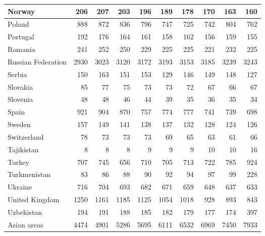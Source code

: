 \begin{table}
\begin{tabular}{|l|r|r|r|r|r|r|r|r|r|}
                        Norway&    206&    207&    203&    196&    189&    178&    170&    163&    160\\\hline
                        Poland&    888&    872&    836&    796&    747&    725&    742&    804&    762\\\hline
                      Portugal&    192&    176&    164&    161&    158&    162&    156&    159&    155\\\hline
                       Romania&    241&    252&    250&    229&    225&    225&    221&    232&    225\\\hline
            Russian Federation&   2930&   3023&   3120&   3172&   3193&   3153&   3185&   3239&   3243\\\hline
                        Serbia&    150&    163&    151&    153&    129&    146&    149&    148&    127\\\hline
                      Slovakia&     85&     77&     75&     73&     73&     72&     67&     66&     67\\\hline
                      Slovenia&     48&     48&     46&     44&     39&     35&     36&     35&     34\\\hline
                         Spain&    921&    904&    870&    757&    774&    777&    741&    739&    698\\\hline
                        Sweden&    157&    149&    141&    138&    137&    132&    128&    124&    126\\\hline
                   Switzerland&     78&     73&     73&     73&     69&     65&     63&     61&     66\\\hline
                    Tajikistan&      8&      8&      8&      9&      9&      9&     10&     10&     16\\\hline
                        Turkey&    707&    745&    656&    710&    705&    713&    722&    785&    924\\\hline
                  Turkmenistan&     83&     86&     88&     90&     92&     94&     97&     99&    228\\\hline
                       Ukraine&    716&    704&    693&    682&    671&    659&    648&    637&    633\\\hline
                United Kingdom&   1250&   1161&   1185&   1125&   1054&   1018&    928&    893&    843\\\hline
                    Uzbekistan&    194&    191&    188&    185&    182&    179&    177&    174&    397\\\hline
                   Asian areas&   4474&   4901&   5286&   5695&   6111&   6532&   6969&   7450&   7933\\\hline

\end{tabular}
\end{table}
